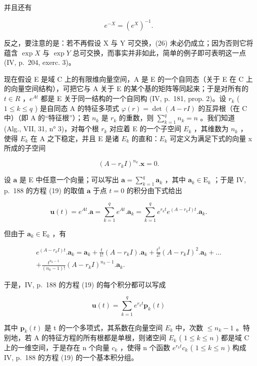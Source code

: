 并且还有

\[
e ^ {- X} = \left(e ^ {X}\right) ^ {- 1}.\tag{30}
\]

反之，要注意的是：若不再假设 X 与 Y 可交换，(26) 未必仍成立；因为否则它将蕴含 \(\exp X\) 与 \(\exp Y\) 总可交换，而事实并非如此，简单的例子即可表明这一点 (IV, p.~204, exerc. 3)。

现在假设 E 是域 C 上的有限维向量空间，A 是 E 的一个自同态（关于 E 在 C 上的向量空间结构），可把它与 A 关于 E 的某个基的矩阵等同起来；于是对所有的 \(t \in R\) ，\(e^{At}\) 都是 E 关于同一结构的一个自同构 (IV, p.~181, prop. 2)。设 \(r_k\) ( \(1 \leqslant k \leqslant q\) ) 是自同态 A 的特征多项式 \(\varphi(r) = \det(A - rI)\) 的互异根（在 C 中）（即 A 的“特征根”）；若 \(n_k\) 是 \(r_k\) 的重数，则 \(\sum_{k=1}^{q} n_k = n\) 。我们知道 (Alg., VII, 31, n° 3)，对每个根 \(r_k\) 对应着 E 的一个子空间 \(E_k\) ，其维数为 \(n_k\) ，使得 \(E_k\) 在 A 之下稳定，并且 E 是诸 \(E_k\) 的直和：\(E_k\) 可定义为满足下式的向量 x 所成的子空间

\[
(A - r _ {k} I) ^ {n _ {k}}. \mathbf {x} = 0.
\]

设 \(\mathbf{a}\) 是 E 中任意一个向量；可以写出 \(\mathbf{a} = \sum_{k=1}^{q} \mathbf{a}_k\) ，其中 \(\mathbf{a}_k \in \mathrm{E}_k\) ；于是 IV, p.~188 的方程 (19) 的取值 \(\mathbf{a}\) 于点 \(t = 0\) 的积分由下式给出

\[
\mathbf {u} (t) = e ^ {A t}. \mathbf {a} = \sum_ {k = 1} ^ {q} e ^ {A t}. \mathbf {a} _ {k} = \sum_ {k = 1} ^ {q} e ^ {r _ {k} t} e ^ {(A - r _ {k} I) t}. \mathbf {a} _ {k}.
\]

但由于 \(\mathbf{a}_k\in \mathrm{E}_k\) ，有

\[
\begin{array}{c} e ^ {(A - r _ {k} I) t}. \mathbf {a} _ {k} = \mathbf {a} _ {k} + \frac {t}{1 !} (A - r _ {k} I). \mathbf {a} _ {k} + \frac {t ^ {2}}{2 !} (A - r _ {k} I) ^ {2}. \mathbf {a} _ {k} + \dots \\ + \frac {t ^ {n _ {k} - 1}}{(n _ {k} - 1) !} (A - r _ {k} I) ^ {n _ {k} - 1}. \mathbf {a} _ {k}. \end{array}\tag{31}
\]

于是，IV, p.~188 的方程 (19) 的每个积分都可以写成

\[
\mathbf {u} (t) = \sum_ {k = 1} ^ {q} e ^ {r _ {k} t} \mathbf {p} _ {k} (t)\tag{32}
\]

其中 \(\mathbf{p}_{k}(t)\) 是 t 的一个多项式，其系数在向量空间 \(E_{k}\) 中，次数 \(\leqslant n_{k}-1\) 。特别地，若 A 的特征方程的所有根都是单根，则诸空间 \(E_{k}\) ( \(1 \leqslant k \leqslant n\) ) 都是域 C 上的一维空间，于是存在 n 个向量 \(c_{k}\) ，使得 n 个函数 \(e^{r_{k}t}c_{k}\) ( \(1 \leqslant k \leqslant n\) ) 构成 IV, p.~188 的方程 (19) 的一个基本积分组。

